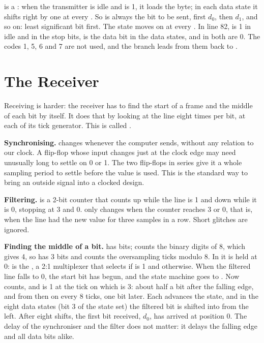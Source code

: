 
 is a : when the transmitter is idle and
 is 1, it loads the byte; in each data state it shifts right by
one at every . So  is always the bit to be sent,
first $d_0$, then $d_1$, and so on: least significant bit first. The state
moves on at every . In line 82,  is 1 in idle
and in the stop bits,  is the data bit in the
data states, and in  both are 0. The codes 1, 5, 6 and 7 are
not used, and the  branch leads from them back to .

\section{The Receiver}
\label{sec:step06-rx}

Receiving is harder: the receiver has to find the start of a frame and the
middle of each bit by itself. It does that by looking at the line eight
times per bit, at each  of its tick generator. This is called
.


\textbf{Synchronising.}  changes whenever the computer sends, without
any relation to our clock. A flip-flop whose input changes just at the clock
edge may need unusually long to settle on 0 or 1. The two flip-flops
 in series give it a whole sampling period to settle before the
value is used. This is the standard way to bring an outside signal into a
clocked design.

\textbf{Filtering.}  is a 2-bit counter that counts up while
the line is 1 and down while it is 0, stopping at 3 and 0.  only
changes when the counter reaches 3 or 0, that is, when the line had the new
value for three samples in a row. Short glitches are ignored.


\textbf{Finding the middle of a bit.}  has  bits;
 counts the binary digits of 8, which gives 4, so  has
3 bits and counts the oversampling ticks modulo 8. In  it is held at
0:  is the , a 2:1 multiplexer that
selects  if  is 1 and  otherwise. When the filtered line falls to 0, the start bit has begun, and the state
machine goes to . Now  counts, and 
is 1 at the tick on which  is 3: about half a bit after the falling
edge, and from then on every 8 ticks, one bit later. Each 
advances the state, and in the eight data states (bit 3 of the state set) the
filtered bit is shifted into  from the left. After eight shifts,
the first bit received, $d_0$, has arrived at position 0. The delay of the
synchroniser and the filter does not matter: it delays the falling edge and
all data bits alike.

